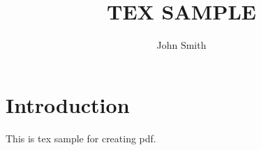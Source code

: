 \documentclass{jarticle}
\begin{document}
\title{\vspace{-15mm}
  TEX SAMPLE
}
\author{John Smith}
\date{}
\maketitle
\thispagestyle{empty}
\pagestyle{empty}
\large

\section{Introduction}
This is tex sample for creating pdf.

\normalsize
\end{document}
